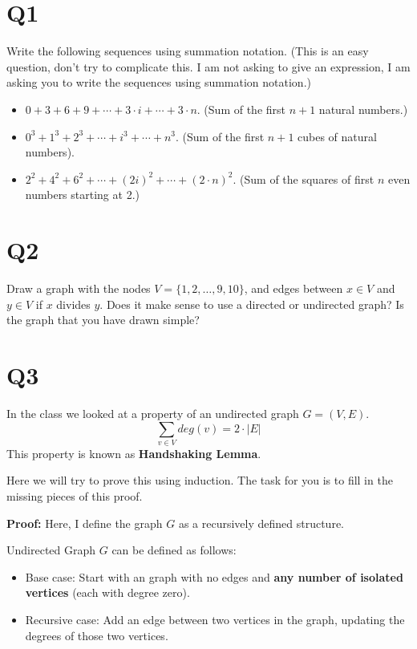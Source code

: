 \documentclass[12pt]{exam}
\begin{document}
\section{Q1}
Write the following sequences using summation notation. (This is an easy question, don't try to complicate this. I am not asking to give an expression, I am asking you to write the sequences using summation notation.)

\begin{itemize}
    \item $0 + 3 + 6 + 9 + \cdots + 3\cdot i + \cdots + 3\cdot n.$ (Sum of the first $n+1$ natural numbers.)
    \item $0^3 + 1^3 + 2^3 + \cdots + i^3 + \cdots + n^3.$ (Sum of the first $n+1$ cubes of natural numbers).
    \item $2^2 + 4^2 + 6^2 + \cdots + (2i)^2 + \cdots + (2\cdot n)^2.$ (Sum of the squares of first $n$ even numbers starting at 2.)
\end{itemize}

\section{Q2} 
Draw a graph with the nodes $V = \{1,2,\ldots, 9,10\}$, and edges between $x \in V$ and $y \in V$ if $x$ divides $y$. Does it make sense to use a directed or undirected graph? Is the graph that you have drawn simple?


\section{Q3}
In the class we looked at a property of an undirected graph $G=(V,E)$.
\[\sum_{v \in V} deg(v) = 2\cdot |E|\]
This property is known as \textbf{Handshaking Lemma}.

Here we will try to prove this using induction. The task for you is to fill in the missing pieces of this proof.

\textbf{Proof:} Here, I define the graph $G$ as a recursively defined structure. 

Undirected Graph $G$ can be defined as follows:
\begin{itemize}
    \item Base case: Start with an graph with no edges and \textbf{any number of isolated vertices} (each with degree zero).
    \item Recursive case: Add an edge between two vertices in the graph, updating the degrees of those two vertices.
\end{itemize}
\end{document}
